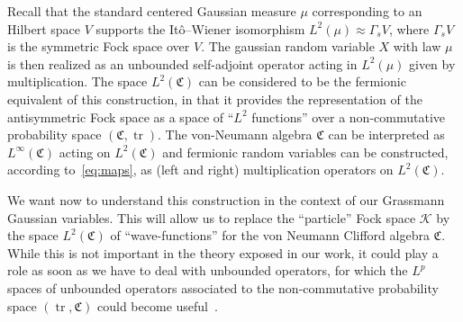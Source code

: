 \documentclass{article}
\newcommand{\tmop}[1]{\ensuremath{\operatorname{#1}}}
\begin{document}
\begin{remark}
  Recall that the standard centered Gaussian measure $\mu$ corresponding to an
  Hilbert space $V$ supports the It\^{o}--Wiener isomorphism $L^2 (\mu)
  \approx \Gamma_s V$, where $\Gamma_s V$ is the symmetric Fock space over
  $V$. The gaussian random variable $X$ with law $\mu$ is then realized as an
  unbounded self-adjoint operator acting in $L^2 (\mu)$ given by
  multiplication. The space $L^2 (\mathfrak{C})$ can be considered to be the
  fermionic equivalent of this construction, in that it provides the
  representation of the antisymmetric Fock space as a space of ``$L^2$
  functions'' over a non-commutative probability space $(\mathfrak{C},
  \tmop{tr})$. The von-Neumann algebra $\mathfrak{C}$ can be interpreted as
  $L^{\infty} (\mathfrak{C})$ acting on $L^2 (\mathfrak{C})$ and fermionic
  random variables can be constructed, according to~{\eqref{eq:maps}}, as
  (left and right) multiplication operators on $L^2 (\mathfrak{C})$.
\end{remark}

We want now to understand this construction in the context of our Grassmann
Gaussian variables. This will allow us to replace the ``particle'' Fock space
$\mathcal{K}$ by the space $L^2 (\mathfrak{C})$ of ``wave-functions'' for the
von Neumann Clifford algebra $\mathfrak{C}$. While this is not important in
the theory exposed in our work, it could play a role as soon as we have to
deal with unbounded operators, for which the $L^p$ spaces of unbounded
operators associated to the non-commutative probability space $(\tmop{tr},
\mathfrak{C})$ could become useful~{\cite{gross_existence_1972}}.

\
\end{document}
